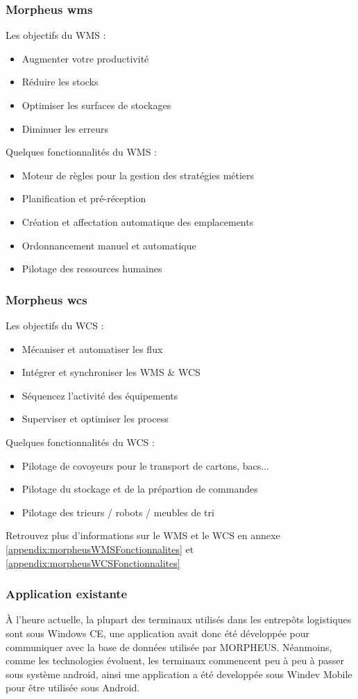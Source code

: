 \documentclass[a4paper, 12pt, french]{article}
\newcommand{\bdot}{\item[\color{ssiYellow}\ding{108}]}
\begin{document}
			\subsubsection{Morpheus \acrshort{wms}}
				\noindent				
				Les objectifs du WMS :
				\begin{itemize}
					\bdot{Augmenter votre productivité}
					\bdot{Réduire les stocks}
					\bdot{Optimiser les surfaces de stockages}
					\bdot{Diminuer les erreurs}
				\end{itemize}
				\vspace{\baselineskip}
				Quelques fonctionnalités du WMS :
				\begin{itemize}
					\bdot{Moteur de règles pour la gestion des stratégies métiers}
					\bdot{Planification et pré-réception}
					\bdot{Création et affectation automatique des emplacements}
					\bdot{Ordonnancement manuel et automatique}
					\bdot{Pilotage des ressources humaines}
				\end{itemize}
			\subsubsection{Morpheus \acrshort{wcs}}
				\noindent
				Les objectifs du WCS :
				\begin{itemize}
					\bdot{Mécaniser et automatiser les flux}
					\bdot{Intégrer et synchroniser les WMS \& WCS}
					\bdot{Séquencez l'activité des équipements}
					\bdot{Superviser et optimiser les process}
				\end{itemize}
				\vspace{\baselineskip}
				Quelques fonctionnalités du WCS :
				\begin{itemize}
					\bdot{Pilotage de covoyeurs pour le transport de cartons, bacs...}
					\bdot{Pilotage du stockage et de la prépartion de commandes}
					\bdot{Pilotage des trieurs / robots / meubles de tri}
				\end{itemize}
				\vspace{\baselineskip}
			Retrouvez plus d'informations sur le WMS et le WCS en annexe \ref{appendix:morpheusWMSFonctionnalites} et \ref{appendix:morpheusWCSFonctionnalites}

			\subsubsection{Application existante}
	À l'heure actuelle, la plupart des terminaux utilisés dans les entrepôts logistiques sont sous Windows CE, une application avait donc été développée pour communiquer avec la base de données utilisée par MORPHEUS. Néanmoins, comme les technologies évoluent, les terminaux commencent peu à peu à passer sous système android, ainsi une application a été developpée sous Windev Mobile pour être utilisée sous Android.
\end{document}
